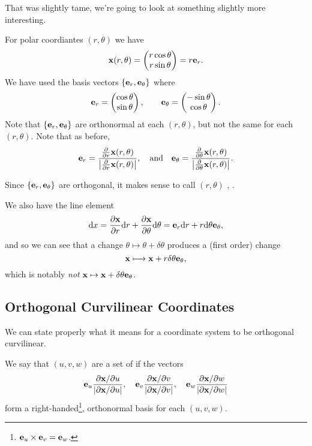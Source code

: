 \documentclass[a4paper]{scrreprt}
\begin{document}
That was slightly tame, we're going to look at something slightly more interesting.

\begin{example}
	For polar coordiantes $(r, \theta)$ we have
	$$
\mathbf{x}(r, \theta) = \begin{pmatrix}
	r \cos \theta \\
	r \sin \theta
\end{pmatrix} = r \mathbf{e}_r.
	$$
	We have used the basis vectors $\{\mathbf{e}_r, \mathbf{e}_\theta\}$ where
	$$
\mathbf{e}_r = \begin{pmatrix}
	\cos \theta \\ \sin \theta
\end{pmatrix}, \quad \quad \mathbf{e}_\theta = \begin{pmatrix}
	- \sin  \theta \\ \cos \theta
\end{pmatrix}.
$$
Note that $\{\mathbf{e}_r, \mathbf{e}_\theta\}$ are orthonormal at each $(r, \theta)$, but not the same for each $(r, \theta)$. Note that as before, 
$$\mathbf{e}_r = \frac{\frac{\partial}{\partial r} \mathbf{x}(r, \theta)}{\left|\frac{\partial}{\partial r} \mathbf{x}(r, \theta)\right|}, \quad \text{and} \quad 
\mathbf{e}_\theta = \frac{\frac{\partial}{\partial \theta} \mathbf{x}(r, \theta)}{\left|\frac{\partial}{\partial \theta} \mathbf{x}(r, \theta)\right|}.$$

Since $\{\mathbf{e}_r, \mathbf{e}_\theta\}$ are orthogonal, it makes sense to call $(r, \theta)$ , .

We also have the line element
$$
\mathrm{d} x = \frac{\partial \mathbf{x}}{\partial r} \mathrm{d} r + \frac{\partial \mathbf{x}}{\partial \theta} \mathrm{d} \theta = \mathbf{e}_r \mathrm{d} r + r \mathrm{d} \theta \mathbf{e}_\theta,
$$
and so we can see that a change $\theta \mapsto \theta + \delta \theta$ produces a (first order) change
$$
\mathbf{x} \longmapsto \mathbf{x} + r \delta \theta \mathbf{e}_\theta,
$$
which is notably \emph{not} $\mathbf{x} \mapsto \mathbf{x} + \delta \theta \mathbf{e}_\theta$.
\end{example}

\subsection{Orthogonal Curvilinear Coordinates}

We can state properly what it means for a coordinate system to be orthogonal curvilinear.

\begin{definition}
	We say that $(u, v, w)$ are a set of  if the vectors
	$$
	\mathbf{e}_u \frac{\partial \mathbf{x} / \partial u}{|\partial \mathbf{x} / \partial u|}, \quad \mathbf{e}_v \frac{\partial \mathbf{x} / \partial v}{|\partial \mathbf{x} / \partial v|}, \quad \mathbf{e}_w \frac{\partial \mathbf{x} / \partial w}{|\partial \mathbf{x} / \partial w|}
	$$
	form a right-handed\footnote{$\mathbf{e}_u \times \mathbf{e}_v = \mathbf{e}_w$.}, orthonormal basis for each $(u, v, w)$.
\end{definition}
\end{document}
